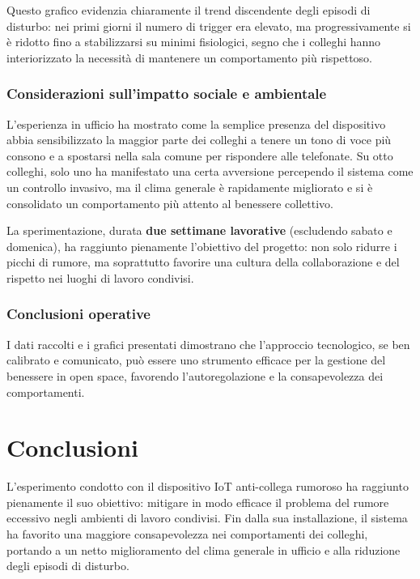 \documentclass[fleqn,10pt]{SelfArx} %
\begin{document}
Questo grafico evidenzia chiaramente il trend discendente degli episodi di disturbo: nei primi giorni il numero di trigger era elevato, ma progressivamente si è ridotto fino a stabilizzarsi su minimi fisiologici, segno che i colleghi hanno interiorizzato la necessità di mantenere un comportamento più rispettoso.

\subsubsection{Considerazioni sull'impatto sociale e ambientale}

L'esperienza in ufficio ha mostrato come la semplice presenza del dispositivo abbia sensibilizzato la maggior parte dei colleghi a tenere un tono di voce più consono e a spostarsi nella sala comune per rispondere alle telefonate. Su otto colleghi, solo uno ha manifestato una certa avversione percependo il sistema come un controllo invasivo, ma il clima generale è rapidamente migliorato e si è consolidato un comportamento più attento al benessere collettivo.

La sperimentazione, durata \textbf{due settimane lavorative} (escludendo sabato e domenica), ha raggiunto pienamente l'obiettivo del progetto: non solo ridurre i picchi di rumore, ma soprattutto favorire una cultura della collaborazione e del rispetto nei luoghi di lavoro condivisi.

\subsubsection{Conclusioni operative}

I dati raccolti e i grafici presentati dimostrano che l'approccio tecnologico, se ben calibrato e comunicato, può essere uno strumento efficace per la gestione del benessere in open space, favorendo l'autoregolazione e la consapevolezza dei comportamenti.


\section{Conclusioni}


L'esperimento condotto con il dispositivo IoT anti-collega rumoroso ha raggiunto pienamente il suo obiettivo: mitigare in modo efficace il problema del rumore eccessivo negli ambienti di lavoro condivisi. Fin dalla sua installazione, il sistema ha favorito una maggiore consapevolezza nei comportamenti dei colleghi, portando a un netto miglioramento del clima generale in ufficio e alla riduzione degli episodi di disturbo. \newline
\end{document}
